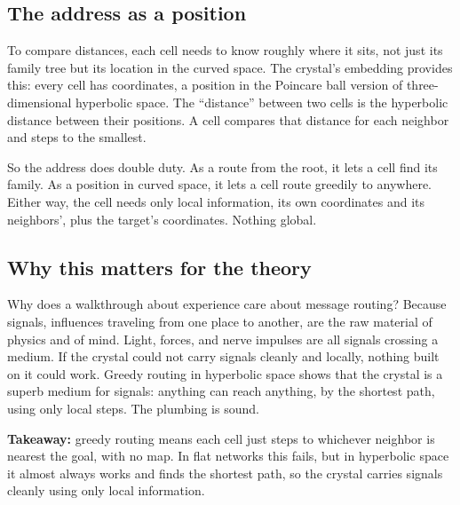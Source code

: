 \subsection{The address as a position}

To compare distances, each cell needs to know roughly where it sits, not just its family tree but its location in the curved space. The crystal's embedding provides this: every cell has coordinates, a position in the Poincare ball version of three-dimensional hyperbolic space. The ``distance'' between two cells is the hyperbolic distance between their positions. A cell compares that distance for each neighbor and steps to the smallest.

So the address does double duty. As a route from the root, it lets a cell find its family. As a position in curved space, it lets a cell route greedily to anywhere. Either way, the cell needs only local information, its own coordinates and its neighbors', plus the target's coordinates. Nothing global.

\subsection{Why this matters for the theory}

Why does a walkthrough about experience care about message routing? Because signals, influences traveling from one place to another, are the raw material of physics and of mind. Light, forces, and nerve impulses are all signals crossing a medium. If the crystal could not carry signals cleanly and locally, nothing built on it could work. Greedy routing in hyperbolic space shows that the crystal is a superb medium for signals: anything can reach anything, by the shortest path, using only local steps. The plumbing is sound.

\textbf{Takeaway:} greedy routing means each cell just steps to whichever neighbor is nearest the goal, with no map. In flat networks this fails, but in hyperbolic space it almost always works and finds the shortest path, so the crystal carries signals cleanly using only local information.
